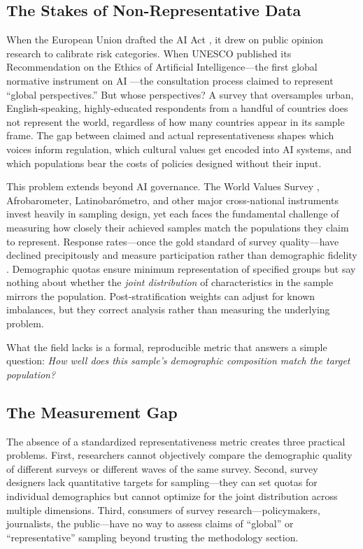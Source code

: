 \documentclass[11pt,a4paper]{article}
\begin{document}
\subsection{The Stakes of Non-Representative Data}

When the European Union drafted the AI Act \citep{eu2024aiact}, it drew on public opinion research to calibrate risk categories. When UNESCO published its Recommendation on the Ethics of Artificial Intelligence---the first global normative instrument on AI \citep{unesco2021ai}---the consultation process claimed to represent ``global perspectives.'' But whose perspectives? A survey that oversamples urban, English-speaking, highly-educated respondents from a handful of countries does not represent the world, regardless of how many countries appear in its sample frame. The gap between claimed and actual representativeness shapes which voices inform regulation, which cultural values get encoded into AI systems, and which populations bear the costs of policies designed without their input.

This problem extends beyond AI governance. The World Values Survey \citep{haerpfer2022wvs}, Afrobarometer, Latinobar\'{o}metro, and other major cross-national instruments invest heavily in sampling design, yet each faces the fundamental challenge of measuring how closely their achieved samples match the populations they claim to represent. Response rates---once the gold standard of survey quality---have declined precipitously and measure participation rather than demographic fidelity \citep{brick2013explaining}. Demographic quotas ensure minimum representation of specified groups but say nothing about whether the \emph{joint distribution} of characteristics in the sample mirrors the population. Post-stratification weights can adjust for known imbalances, but they correct analysis rather than measuring the underlying problem.

What the field lacks is a formal, reproducible metric that answers a simple question: \emph{How well does this sample's demographic composition match the target population?}

\subsection{The Measurement Gap}

The absence of a standardized representativeness metric creates three practical problems. First, researchers cannot objectively compare the demographic quality of different surveys or different waves of the same survey. Second, survey designers lack quantitative targets for sampling---they can set quotas for individual demographics but cannot optimize for the joint distribution across multiple dimensions. Third, consumers of survey research---policymakers, journalists, the public---have no way to assess claims of ``global'' or ``representative'' sampling beyond trusting the methodology section.
\end{document}
